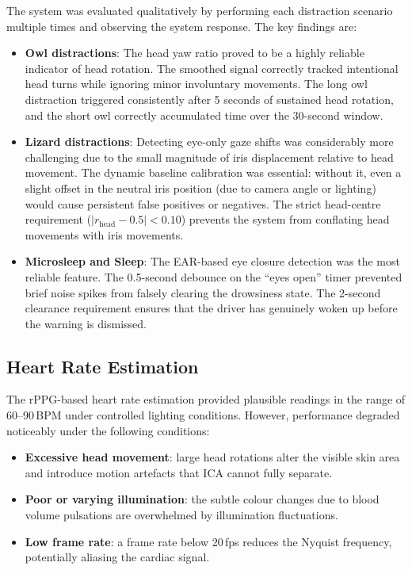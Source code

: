 \documentclass[12pt,a4paper]{article}
\begin{document}
The system was evaluated qualitatively by performing each distraction scenario multiple times and observing the system response. The key findings are:

\begin{itemize}
    \item \textbf{Owl distractions}: The head yaw ratio proved to be a highly reliable indicator of head rotation. The smoothed signal correctly tracked intentional head turns while ignoring minor involuntary movements. The long owl distraction triggered consistently after 5 seconds of sustained head rotation, and the short owl correctly accumulated time over the 30-second window.
    
    \item \textbf{Lizard distractions}: Detecting eye-only gaze shifts was considerably more challenging due to the small magnitude of iris displacement relative to head movement. The dynamic baseline calibration was essential: without it, even a slight offset in the neutral iris position (due to camera angle or lighting) would cause persistent false positives or negatives. The strict head-centre requirement ($|r_{\text{head}} - 0.5| < 0.10$) prevents the system from conflating head movements with iris movements.
    
    \item \textbf{Microsleep and Sleep}: The EAR-based eye closure detection was the most reliable feature. The 0.5-second debounce on the ``eyes open'' timer prevented brief noise spikes from falsely clearing the drowsiness state. The 2-second clearance requirement ensures that the driver has genuinely woken up before the warning is dismissed.
\end{itemize}

\subsection{Heart Rate Estimation}

The rPPG-based heart rate estimation provided plausible readings in the range of 60--90\,BPM under controlled lighting conditions. However, performance degraded noticeably under the following conditions:

\begin{itemize}[noitemsep]
    \item \textbf{Excessive head movement}: large head rotations alter the visible skin area and introduce motion artefacts that ICA cannot fully separate.
    \item \textbf{Poor or varying illumination}: the subtle colour changes due to blood volume pulsations are overwhelmed by illumination fluctuations.
    \item \textbf{Low frame rate}: a frame rate below 20\,fps reduces the Nyquist frequency, potentially aliasing the cardiac signal.
\end{itemize}
\end{document}

